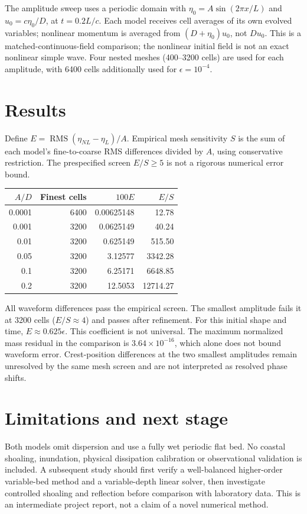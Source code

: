 \documentclass[11pt]{article}
\begin{document}
The amplitude sweep uses a periodic domain with
$\eta_0=A\sin(2\pi x/L)$ and $u_0=c\eta_0/D$, at $t=0.2L/c$.
Each model receives cell averages of its own evolved variables; nonlinear
momentum is averaged from $(D+\eta_0)u_0$, not $Du_0$.
This is a matched-continuous-field comparison; the nonlinear initial field is
not an exact nonlinear simple wave. Four nested meshes (400--3200 cells) are
used for each amplitude, with 6400 cells additionally used for $\epsilon=10^{-4}$.

\section{Results}
Define $E=\operatorname{RMS}(\eta_{NL}-\eta_L)/A$. Empirical mesh sensitivity
$S$ is the sum of each model's fine-to-coarse RMS differences divided by $A$,
using conservative restriction. The prespecified screen $E/S\geq5$ is not
a rigorous numerical error bound.
\begin{center}
\begin{tabular}{rrrr}
\toprule
$A/D$ & Finest cells & $100E$ & $E/S$\\
\midrule
0.0001 & 6400 & 0.00625148 & 12.78\\
0.001 & 3200 & 0.0625149 & 40.24\\
0.01 & 3200 & 0.625149 & 515.50\\
0.05 & 3200 & 3.12577 & 3342.28\\
0.1 & 3200 & 6.25171 & 6648.85\\
0.2 & 3200 & 12.5053 & 12714.27\\
\bottomrule
\end{tabular}
\end{center}
All waveform differences pass the empirical screen. The smallest amplitude
fails it at 3200 cells ($E/S\approx4$) and passes after refinement. For this
initial shape and time, $E\approx0.625\epsilon$. This coefficient is not
universal. The maximum normalized mass residual in the comparison is
$3.64\times10^{-16}$, which alone does not bound waveform error.
Crest-position differences at the two smallest amplitudes remain unresolved
by the same mesh screen and are not interpreted as resolved phase shifts.

\section{Limitations and next stage}
Both models omit dispersion and use a fully wet periodic flat bed. No coastal
shoaling, inundation, physical dissipation calibration or observational validation
is included. A subsequent study should first verify a well-balanced higher-order
variable-bed method and a variable-depth linear solver, then investigate
controlled shoaling and reflection before comparison with laboratory data.
This is an intermediate project report, not a claim of a novel numerical method.
\end{document}
